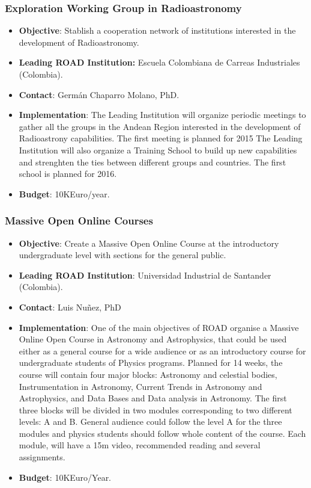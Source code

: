 \documentclass[12pt]{article}
\begin{document}
\subsubsection{Exploration Working Group in Radioastronomy}
\begin{itemize}
\item{\bf Objective}: Stablish a cooperation network of institutions interested in the development of Radioastronomy.
\item{\bf Leading ROAD Institution:} Escuela Colombiana de Carreas
  Industriales (Colombia).
\item{\bf Contact}: Germ\'an Chaparro Molano, PhD.
\item{\bf Implementation}: The Leading Institution will organize
  periodic meetings to gather all the groups in the Andean Region
  interested in the development of Radioastrony capabilities. The
  first meeting is planned for 2015 
The Leading Institution will also organize a Training School to build
up new capabilities and strenghten the ties between different groups
and countries. The first school is planned for 2016.
\item{\bf Budget}: 10KEuro/year.
\end{itemize}


\subsubsection{Massive Open Online Courses}
\begin{itemize}
\item{\bf Objective}: Create a Massive Open
Online Course at the introductory undergraduate level with sections for
the general public. 
\item{\bf Leading ROAD Institution}: Universidad Industrial de
  Santander (Colombia).  
\item{\bf Contact}: Luis Nu\~nez, PhD
\item{\bf Implementation}: 
One of the main objectives of ROAD organise a Massive Online Open
Course in Astronomy and Astrophysics, that could be used either as a
general course for a wide audience or as an introductory course for
undergraduate students of  Physics programs. Planned for 14 weeks,
the course will contain four major blocks: Astronomy and celestial
bodies, Instrumentation in Astronomy, Current Trends in Astronomy and
Astrophysics, and  Data Bases and Data analysis in Astronomy. The
first three blocks will be divided in two modules corresponding to two
different levels: A and B. General audience could follow the level A
for the three modules and physics students should follow whole content
of the course. Each module, will have a 15m video, recommended reading
and several assignments.  
\item{\bf Budget}: 10KEuro/Year.
\end{itemize}
\end{document}
